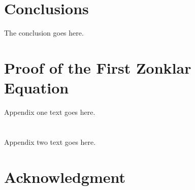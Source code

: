 \documentclass[journal]{IEEEtran}
\newcommand{\simo}[1]{{\color{red}#1}}
\begin{document}

\section{Conclusions}
The conclusion goes here.






%


\appendices
\section{Proof of the First Zonklar Equation}
Appendix one text goes here.

\section{}
Appendix two text goes here.


\section*{Acknowledgment}
\end{document}
